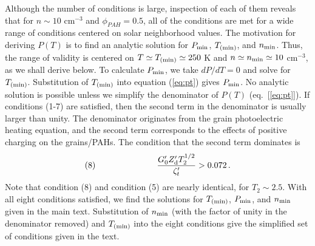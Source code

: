 \documentclass[12pt,preprint,flushrt]{aastex}
\newcommand{\beq}{\begin{equation}}
\newcommand{\eeq}{\end{equation}}
\newcommand{\pmin}{P_{\rm min}}
\newcommand{\tmin}{T_{\rm (min)}}
\newcommand{\nmin}{n_{\rm min}}
\newcommand{\gs}{G_{0}^\prime}
\newcommand{\zd}{Z_{\rm d}^\prime}
\newcommand{\zio}{\zeta_{t}^\prime}
\begin{document}
Although the number of conditions is large, inspection of each
of them reveals that for $n\sim 10$ cm$^{-3}$ and $\phi _{PAH}=0.5$, all of the conditions
are met for a wide range of conditions centered on solar neighborhood
values. The motivation for deriving $P(T)$ is to find an analytic solution
for $\pmin$, $\tmin$, and $\nmin$. Thus, the range of validity is
centered on $T\simeq \tmin \simeq 250$ K and $n\simeq \nmin \simeq 10$
cm$^{-3}$, as we shall derive below. To calculate $\pmin$, we take
$d P/d T = 0$ and solve for $\tmin$. Substitution
of $\tmin$ into equation (\ref{eq:pt}) gives $\pmin$. No analytic
solution is possible unless we simplify the denominator of
$P(T)$ (eq.~[\ref{eq:pt}]). If conditions (1-7) are satisfied, then
the second term in the denominator is usually larger than unity.
The denominator originates from the grain photoelectric heating
equation, and the second term corresponds to the effects of
positive charging on the grains/PAHs. The condition that the
second term dominates is
\beq
(8)\hspace{1.0in}\frac{\gs \zd T_2^{1/2}}{\zio} > 0.072\, .
\eeq
Note that condition (8) and condition (5) are nearly identical,
for $T_2\sim 2.5$. With all eight conditions satisfied, we find the
solutions for $\tmin$, $\pmin$, and $\nmin$ given in the
main text. Substitution of $\nmin$ (with the factor of 
unity in the denominator removed) and $\tmin$ into the
eight conditions give the simplified set of conditions given in
the text.
\end{document}
